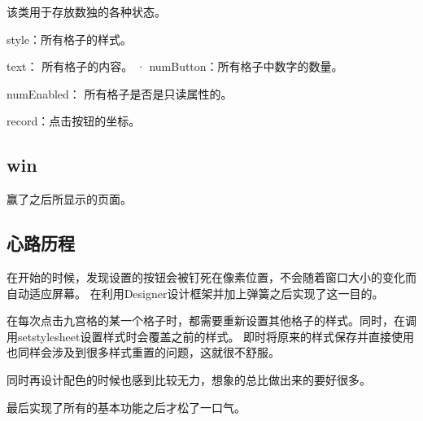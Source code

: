\documentclass[hyperref,UTF8]{ctexart}
\begin{document}
    该类用于存放数独的各种状态。

    style：所有格子的样式。

    text： 所有格子的内容。
·
    numButton：所有格子中数字的数量。

    numEnabled： 所有格子是否是只读属性的。

    record：点击按钮的坐标。


\subsection{win}
    赢了之后所显示的页面。

\newpage

\subsection{心路历程}

    在开始的时候，发现设置的按钮会被钉死在像素位置，不会随着窗口大小的变化而自动适应屏幕。
    在利用Designer设计框架并加上弹簧之后实现了这一目的。

    在每次点击九宫格的某一个格子时，都需要重新设置其他格子的样式。同时，在调用setstylesheet设置样式时会覆盖之前的样式。
    即时将原来的样式保存并直接使用也同样会涉及到很多样式重置的问题，这就很不舒服。

    同时再设计配色的时候也感到比较无力，想象的总比做出来的要好很多。

    最后实现了所有的基本功能之后才松了一口气。
\end{document}
